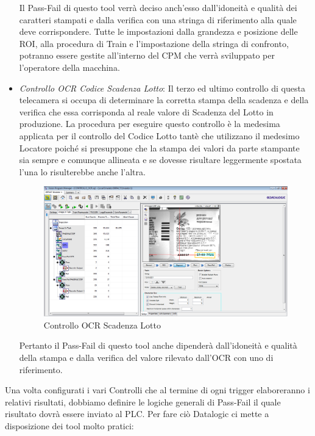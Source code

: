 \documentclass[12pt, a4paper, oneside]{book}
\begin{document}
\begin{itemize}
Il Pass-Fail di questo tool verrà deciso anch'esso dall'idoneità e qualità dei caratteri stampati e dalla verifica con una stringa di riferimento alla quale deve corrispondere. Tutte le impostazioni dalla grandezza e posizione delle ROI, alla procedura di Train e l'impostazione della stringa di confronto, potranno essere gestite all'interno del CPM che verrà sviluppato per l'operatore della macchina. 
	
	
	\item \textit{Controllo OCR Codice Scadenza Lotto}: Il terzo ed ultimo controllo di questa telecamera si occupa di determinare la corretta stampa della scadenza e della verifica che essa corrisponda al reale valore di Scadenza del Lotto in produzione. La procedura per eseguire questo controllo è la medesima applicata per il controllo del Codice Lotto tantè che utilizzano il medesimo Locatore poiché si presuppone che la stampa dei valori da parte stampante sia sempre e comunque allineata e se dovesse risultare leggermente spostata l'una lo risulterebbe anche l'altra. 
	
	\begin{figure}[H]
		\centering
		\includegraphics[width=13cm]{Immagini/VIS11}
		\caption{Controllo OCR Scadenza Lotto}
		\label{vis11}
	\end{figure}
	
	Pertanto il Pass-Fail di questo tool anche dipenderà dall'idoneità e qualità della stampa e dalla verifica del valore rilevato dall'OCR con uno di riferimento.

\end{itemize}

Una volta configurati i vari Controlli che al termine di ogni trigger elaboreranno i relativi risultati, dobbiamo definire le logiche generali di Pass-Fail il quale risultato dovrà essere inviato al PLC.
Per fare ciò Datalogic ci mette a disposizione dei tool molto pratici:
\end{document}
